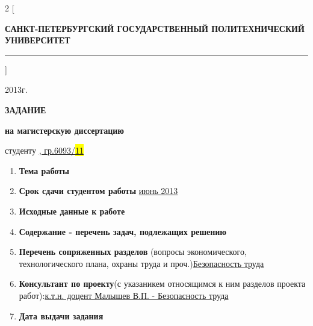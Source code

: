 \documentclass{report}
\begin{document}
\begin{multicols}{2}
[\begin{center}
\textbf{САНКТ-ПЕТЕРБУРГСКИЙ ГОСУДАРСТВЕННЫЙ ПОЛИТЕХНИЧЕСКИЙ УНИВЕРСИТЕТ}\hrule
\end{center}]
{
\par
{} \hspace{2,3cm} {2013г.}\par
\par
{}}
\end{multicols}
\begin{center}
\textbf{ЗАДАНИЕ}\par
\textbf{на магистерскую диссертацию}
\end{center}
студенту \hspace{8.6cm}
\underline{, гр.6093/\colorbox{yellow}{11}}\par
\begin{enumerate}
\item\textbf{Тема работы}\par
\item \textbf{Срок сдачи студентом работы} \hspace{1cm} \underline{июнь 2013}\par
\item\textbf{Исходные данные к работе}\par
\item\textbf{Содержание - перечень задач, подлежащих решению}\par
\vspace{1cm}
\item\textbf{Перечень сопряженных разделов} (вопросы экономического, технологического плана, охраны труда и проч.)\underline{\hspace{0.5cm}Безопасность труда}\par
\vspace{1.5cm}
\item\textbf{Консультант по проекту}(с указаникем относящимся к ним разделов проекта работ):\underline{\hspace{0.5cm}к.т.н. доцент Малышев В.П. - Безопасность труда}\par
\vspace{1cm}
\item\textbf{Дата выдачи задания}\par
\end{enumerate}
\end{document}
